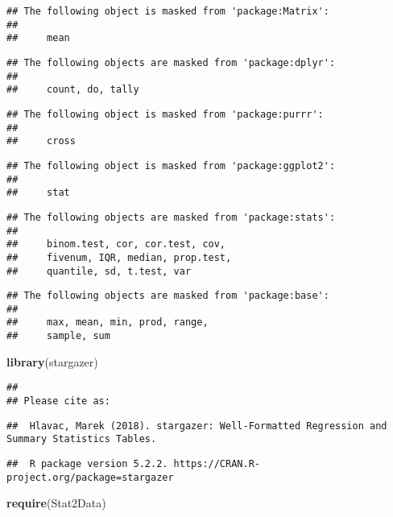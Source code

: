 \documentclass[]{tufte-handout}
\newenvironment{Shaded}{\begin{snugshade}}{\end{snugshade}}
\newcommand{\KeywordTok}[1]{\textcolor[rgb]{0.13,0.29,0.53}{\textbf{#1}}}
\newcommand{\NormalTok}[1]{#1}
\begin{document}
\begin{verbatim}
## The following object is masked from 'package:Matrix':
## 
##     mean
\end{verbatim}

\begin{verbatim}
## The following objects are masked from 'package:dplyr':
## 
##     count, do, tally
\end{verbatim}

\begin{verbatim}
## The following object is masked from 'package:purrr':
## 
##     cross
\end{verbatim}

\begin{verbatim}
## The following object is masked from 'package:ggplot2':
## 
##     stat
\end{verbatim}

\begin{verbatim}
## The following objects are masked from 'package:stats':
## 
##     binom.test, cor, cor.test, cov,
##     fivenum, IQR, median, prop.test,
##     quantile, sd, t.test, var
\end{verbatim}

\begin{verbatim}
## The following objects are masked from 'package:base':
## 
##     max, mean, min, prod, range,
##     sample, sum
\end{verbatim}

\begin{Shaded}
\begin{Highlighting}[]
\KeywordTok{library}\NormalTok{(stargazer)}
\end{Highlighting}
\end{Shaded}

\begin{verbatim}
## 
## Please cite as:
\end{verbatim}

\begin{verbatim}
##  Hlavac, Marek (2018). stargazer: Well-Formatted Regression and Summary Statistics Tables.
\end{verbatim}

\begin{verbatim}
##  R package version 5.2.2. https://CRAN.R-project.org/package=stargazer
\end{verbatim}

\begin{Shaded}
\begin{Highlighting}[]
\KeywordTok{require}\NormalTok{(Stat2Data)}
\end{Highlighting}
\end{Shaded}
\end{document}
